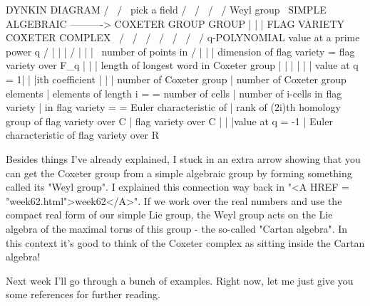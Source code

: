                           DYNKIN DIAGRAM
                          /             \
                         /               \
           pick a field /                 \ 
                       /                   \
                      /                     \
                     /       Weyl group      \
           SIMPLE ALGEBRAIC ----------> COXETER GROUP 
                 GROUP                        | 
                    |                         | 
              FLAG VARIETY             COXETER COMPLEX 
                     \                       /
                      \                     /
                       \                   /
                        \                 /
                         \               /
                          \             /
                           \           /
                           q-POLYNOMIAL
 value at a prime power q /   |  |  |  \degree
                         /    |  |  |   \
    number of points in /     |  |  |  dimension of flag variety =
  flag variety over F_q       |  |  |  length of longest word in Coxeter group
                              |  |  |
                              |  |  |
                value at q = 1|  |  |ith coefficient
                              |  |  |
         number of Coxeter group | number of Coxeter group 
                        elements | elements of length i =
               = number of cells | number of i-cells  
                 in flag variety | in flag variety = 
       = Euler characteristic of | rank of (2i)th homology group of
             flag variety over C | flag variety over C
                                 |
                                 |
                                 |value at q = -1
                                 |
              Euler characteristic of flag variety over R 
$$
    

Besides things I've already explained, I stuck in an extra arrow showing
that you can get the Coxeter group from a simple algebraic group by
forming something called its "Weyl group".  I explained this
connection way back in "<A HREF = "week62.html">week62</A>".
If we work over the real numbers and use the compact real form of our
simple Lie group, the Weyl group acts on the Lie algebra of the maximal
torus of this group - the so-called "Cartan algebra".  In this
context it's good to think of the Coxeter complex as sitting inside the
Cartan algebra!

Next week I'll go through a bunch of examples.  Right now, let me
just give you some references for further reading.

